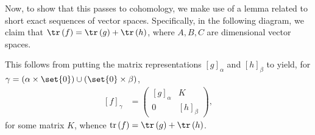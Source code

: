 \documentclass[10pt]{mypackage}
\begin{document}
\begin{solution}
  Now, to show that this passes to cohomology, we make use of a lemma related to short exact sequences of vector spaces. Specifically, in the following diagram, we claim that $\tr\left( f \right) = \tr\left( g \right) + \tr\left( h \right)$, where $A,B,C$ are dimensional vector spaces.
  \begin{center}
  \end{center}
  This follows from putting the matrix representations $\left[ g \right]_{\alpha}$ and $\left[ h \right]_{\beta}$ to yield, for $\gamma = \left( \alpha\times \set{0} \right)\cup \left( \set{0}\times \beta \right)$,
  \begin{align*}
    \left[ f \right]_{\gamma} &= \begin{pmatrix}\left[ g \right]_{\alpha} & K \\ 0 & \left[ h \right]_{\beta}\end{pmatrix},
  \end{align*}
  for some matrix $K$, whence $\operatorname{tr}\left( f \right) = \tr\left( g \right) + \tr\left( h \right)$.\newline


\end{solution}
\end{document}
